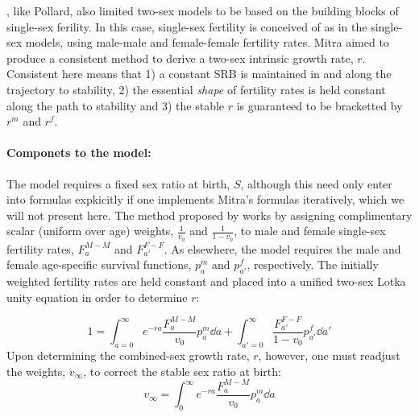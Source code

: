 \label{sec:mitraage}
\citet{mitra1978derivation}, like Pollard, also limited two-sex models to be
based on the building blocks of single-sex ferility. In this case, single-sex fertility is
conceived of as in the single-sex models, using male-male and female-female
fertility rates. Mitra aimed to produce a consistent
method to derive a two-sex intrinsic growth rate, $r$. Consistent here means 
that 1) a constant SRB is maintained in and along the trajectory to stability, 2) 
the essential \textit{shape} of fertility rates is held constant along the path 
to stability and 3) the stable $r$ is guaranteed to be bracketted by $r^m$ and $r^f$.

\paragraph{Componets to the model: }
The model requires a fixed sex ratio at birth, $S$, although this need only
enter into formulas expkicitly if one implements Mitra's formulas iteratively,
which we will not present here. The method proposed by \citet{mitra1978derivation} works
by assigning complimentary scalar (uniform over age) weights, $\frac{1}{v_0}$ 
and $\frac{1}{1 - v_0}$, to male and female single-sex fertility rates, $F_a
^{M-M}$ and $F_{a'} ^{F-F}$. As elsewhere, the model requires the male
and female age-specific survival functions, $p_a^m$ and
$p_{a'}^f$, respectively. The initially weighted fertility rates are held
constant and placed into a unified two-sex Lotka unity equation in order to
determine $r$:

\begin{equation}
\label{eq:mitralotka}
1 = \int _{a=0} ^\infty e^{-r a} \frac{F_a ^{M-M}}{v_0} p_a^m \dd a + \int
_{a'=0} ^\infty \frac{F_{a'} ^{F-F}}{1 - v_0} p_{a'}^f \dd a'
\end{equation}
Upon determining the combined-sex growth rate, $r$, however, one must readjust
the weights, $v_\infty$, to correct the stable sex ratio at birth:
\begin{equation}
\label{eq:mitrastablev}
v_\infty = \int _0^\infty e^{-ra} \frac{F_a ^{M-M}}{v_0} p_a^m \dd a
\end{equation}

